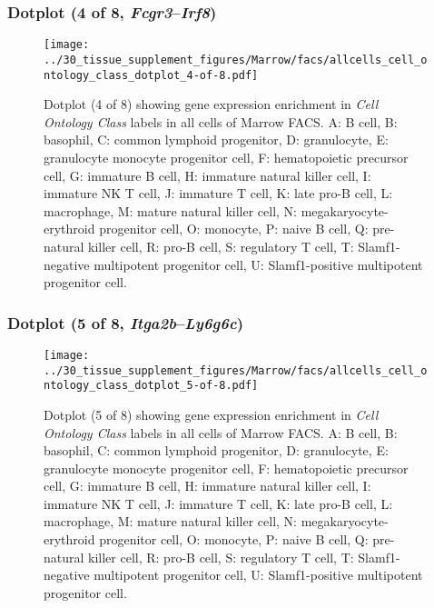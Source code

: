 \subsubsection{Dotplot (4 of 8, \emph{Fcgr3}--\emph{Irf8})}
\begin{figure}[h]
\centering
\texttt{[image: ../30\_tissue\_supplement\_figures/Marrow/facs/allcells\_cell\_ontology\_class\_dotplot\_4-of-8.pdf]}

\caption{ Dotplot (4 of 8)  showing gene expression enrichment in \emph{Cell Ontology Class} labels in all cells of Marrow FACS. A: B cell, B: basophil, C: common lymphoid progenitor, D: granulocyte, E: granulocyte monocyte progenitor cell, F: hematopoietic precursor cell, G: immature B cell, H: immature natural killer cell, I: immature NK T cell, J: immature T cell, K: late pro-B cell, L: macrophage, M: mature natural killer cell, N: megakaryocyte-erythroid progenitor cell, O: monocyte, P: naive B cell, Q: pre-natural killer cell, R: pro-B cell, S: regulatory T cell, T: Slamf1-negative multipotent progenitor cell, U: Slamf1-positive multipotent progenitor cell.}
\end{figure}


\clearpage

\subsubsection{Dotplot (5 of 8, \emph{Itga2b}--\emph{Ly6g6c})}
\begin{figure}[h]
\centering
\texttt{[image: ../30\_tissue\_supplement\_figures/Marrow/facs/allcells\_cell\_ontology\_class\_dotplot\_5-of-8.pdf]}

\caption{ Dotplot (5 of 8)  showing gene expression enrichment in \emph{Cell Ontology Class} labels in all cells of Marrow FACS. A: B cell, B: basophil, C: common lymphoid progenitor, D: granulocyte, E: granulocyte monocyte progenitor cell, F: hematopoietic precursor cell, G: immature B cell, H: immature natural killer cell, I: immature NK T cell, J: immature T cell, K: late pro-B cell, L: macrophage, M: mature natural killer cell, N: megakaryocyte-erythroid progenitor cell, O: monocyte, P: naive B cell, Q: pre-natural killer cell, R: pro-B cell, S: regulatory T cell, T: Slamf1-negative multipotent progenitor cell, U: Slamf1-positive multipotent progenitor cell.}
\end{figure}


\clearpage

